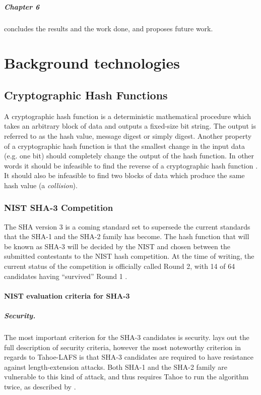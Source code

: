 \documentclass[english,12pt,a4paper]{book}
\begin{document}
\paragraph{Chapter 6} concludes the results and the work done, and proposes
future work.


\chapter{Background technologies}

\section{Cryptographic Hash Functions}

A cryptographic hash function is a deterministic mathematical procedure which
takes an arbitrary block of data and outputs a fixed-size bit string. The output
is referred to as the hash value, message digest or simply digest.
Another property of a cryptographic hash function is that the smallest change in
the input data (e.g. one bit) should completely change the output of the hash
function. In other words it should be infeasible to find the reverse of a
cryptographic hash function \cite[p. 335]{stallings}. It should also be infeasible to
find two blocks of data which produce the same hash value (a \emph{collision}).

\subsection{NIST SHA-3 Competition}
The \ac{SHA} version 3 is a coming standard set to supersede the current
standards that the \ac{SHA}-1 and the \ac{SHA}-2 family has become. The hash
function that will be known as \ac{SHA}-3 will be decided by the \ac{NIST} and
chosen between the submitted contestants to the \ac{NIST} hash competition.
At the time of writing, the current status of the competition is officially
called Round 2, with 14 of 64 candidates having ``survived'' Round 1
\cite{s_fedreg}.

\subsubsection{\ac{NIST} evaluation criteria for \ac{SHA}-3}

\label{sec:lengthextension}
\paragraph{Security.} The most important criterion for the SHA-3
candidates\cite{s_nistround2} is security. \citet{s_fedreg} lays out the full
description of security criteria, however the most noteworthy criterion
in regards to Tahoe-\ac{LAFS} is that \ac{SHA}-3 candidates are required to have
resistance against length-extension attacks. Both \ac{SHA}-1 and the \ac{SHA}-2
family are vulnerable to this kind of attack, and thus requires
Tahoe to run the algorithm twice, as described by \citet{schneier}.
\end{document}
